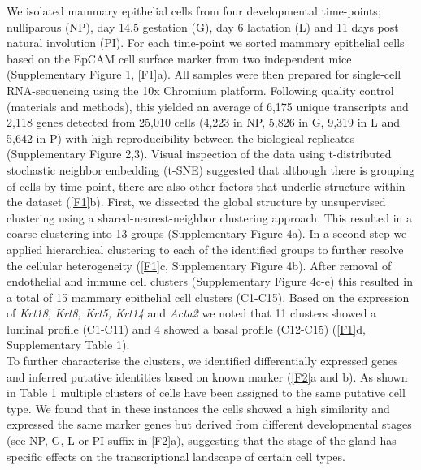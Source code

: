 \documentclass[titlepage, 12pt, oneside]{amsart}
\begin{document}
We isolated mammary epithelial cells from four developmental time-points; nulliparous (NP), day 14.5 gestation (G), day 6 lactation (L) and 11 days post natural involution (PI).
For each time-point we sorted mammary epithelial cells based on the EpCAM cell surface marker from two independent mice (Supplementary Figure 1, \autoref{F1}a).
All samples were then prepared for single-cell RNA-sequencing using the 10x Chromium platform\autocite{Zheng2017}.
Following quality control (materials and methods), this yielded an average of 6,175 unique transcripts and 2,118 genes detected from 25,010 cells (4,223 in NP, 5,826 in G, 9,319 in L and 5,642 in P) with high reproducibility between the biological replicates (Supplementary Figure 2,3).
Visual inspection of the data using t-distributed stochastic neighbor embedding (t-SNE) suggested that although there is grouping of cells by time-point, there are also other factors that underlie structure within the dataset (\autoref{F1}b).
First, we dissected the global structure by unsupervised clustering using a shared-nearest-neighbor clustering approach.
This resulted in a coarse clustering into 13 groups (Supplementary Figure 4a).
In a second step we applied hierarchical clustering to each of the identified groups to further resolve the cellular heterogeneity (\autoref{F1}c, Supplementary Figure 4b).
After removal of endothelial and immune cell clusters (Supplementary Figure 4c-e) this resulted in a total of 15 mammary epithelial cell clusters (C1-C15).
Based on the expression of \textit{Krt18,} \textit{Krt8, Krt5, Krt14} and \textit{Acta2} we noted that 11 clusters showed a luminal profile (C1-C11) and 4 showed a basal profile (C12-C15) (\autoref{F1}d, Supplementary Table 1).\\

To further characterise the clusters, we identified differentially expressed genes and inferred putative identities based on known marker (\autoref{F2}a and b).
As shown in Table 1 multiple clusters of cells have been assigned to the same putative cell type.
We found that in these instances the cells showed a high similarity and expressed the same marker genes but derived from different developmental stages (see NP, G, L or PI suffix in \autoref{F2}a), suggesting that the stage of the gland has specific effects on the transcriptional landscape of certain cell types.\\
\end{document}
